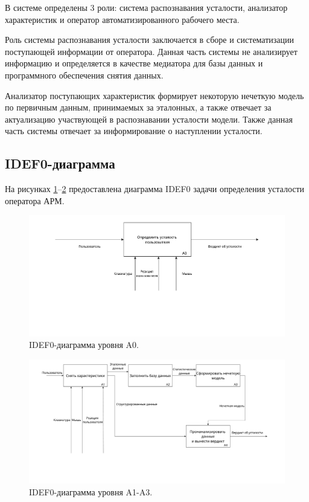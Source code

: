 В системе определены 3 роли: система распознавания усталости, анализатор характеристик и оператор автоматизированного рабочего места.

Роль системы распознавания усталости заключается в сборе и систематизации поступающей информации от оператора. Данная часть системы не анализирует информацию и определяется в качестве медиатора для базы данных и программного обеспечения снятия данных.

Анализатор поступающих характеристик формирует некоторую нечеткую модель по первичным данным, принимаемых за эталонных, а также отвечает за актуализацию участвующей в распознавании усталости модели. Также данная часть системы отвечает за информирование о наступлении усталости.

\subsection{IDEF0-диаграмма}
На рисунках \ref{fig:idef:0}--\ref{fig:idef:1} предоставлена диаграмма IDEF0 задачи определения усталости оператора АРМ.

\begin{figure}[H]
	\centering
	\includegraphics[width=\textwidth]{img/A0.pdf}
	\caption{IDEF0-диаграмма уровня A0.}
	\label{fig:idef:0}
\end{figure}

\begin{figure}[H]
	\centering
	\includegraphics[scale=0.28]{img/A123.pdf}
	\caption{IDEF0-диаграмма уровня A1-A3.}
	\label{fig:idef:1}
\end{figure}

